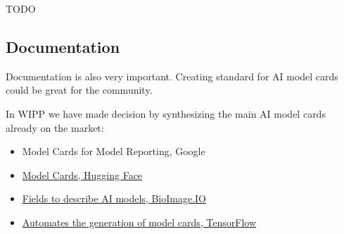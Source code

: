 TODO

\subsection{Documentation}

Documentation is also very important. Creating standard for AI model cards
could be great for the community.

In WIPP we have made decision by synthesizing the main AI model cards
already on the market:
\begin{itemize}
    \item Model Cards for Model Reporting, Google \cite{DBLP:journals/corr/abs-1810-03993}
    \item \href{https://huggingface.co/docs/hub/en/model-cards}{Model Cards, Hugging Face}
    \item \href{https://bioimage.io/docs/#/bioimageio_model_spec}{Fields to describe AI models, BioImage.IO}
    \item \href{https://github.com/tensorflow/model-card-toolkit}{Automates the generation of model cards, TensorFlow}
\end{itemize}




\def\firstellip{(1.6, 0) ellipse [x radius=2.7cm, y radius=1.5cm, rotate=50]}
\def\secondellip{(0.3, 1cm) ellipse [x radius=2.7cm, y radius=1.5cm, rotate=50]}
\def\thirdellip{(-1.6, 0) ellipse [x radius=2.7cm, y radius=1.5cm, rotate=-50]}
\def\fourthellip{(-0.3, 1cm) ellipse [x radius=2.7cm, y radius=1.5cm, rotate=-50]}

